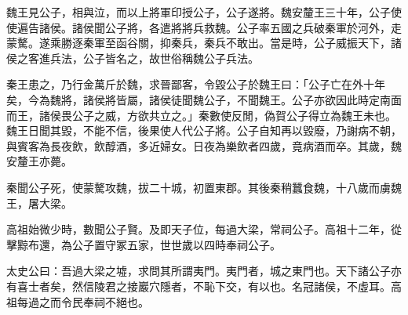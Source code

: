\begin{pinyinscope}
魏王見公子，相與泣，而以上將軍印授公子，公子遂將。魏安釐王三十年，公子使使遍告諸侯。諸侯聞公子將，各遣將將兵救魏。公子率五國之兵破秦軍於河外，走蒙驁。遂乘勝逐秦軍至函谷關，抑秦兵，秦兵不敢出。當是時，公子威振天下，諸侯之客進兵法，公子皆名之，故世俗稱魏公子兵法。

秦王患之，乃行金萬斤於魏，求晉鄙客，令毀公子於魏王曰：「公子亡在外十年矣，今為魏將，諸侯將皆屬，諸侯徒聞魏公子，不聞魏王。公子亦欲因此時定南面而王，諸侯畏公子之威，方欲共立之。」秦數使反閒，偽賀公子得立為魏王未也。魏王日聞其毀，不能不信，後果使人代公子將。公子自知再以毀廢，乃謝病不朝，與賓客為長夜飲，飲醇酒，多近婦女。日夜為樂飲者四歲，竟病酒而卒。其歲，魏安釐王亦薨。

秦聞公子死，使蒙驁攻魏，拔二十城，初置東郡。其後秦稍蠶食魏，十八歲而虜魏王，屠大梁。

高祖始微少時，數聞公子賢。及即天子位，每過大梁，常祠公子。高祖十二年，從擊黥布還，為公子置守冢五家，世世歲以四時奉祠公子。

太史公曰：吾過大梁之墟，求問其所謂夷門。夷門者，城之東門也。天下諸公子亦有喜士者矣，然信陵君之接巖穴隱者，不恥下交，有以也。名冠諸侯，不虛耳。高祖每過之而令民奉祠不絕也。


\end{pinyinscope}